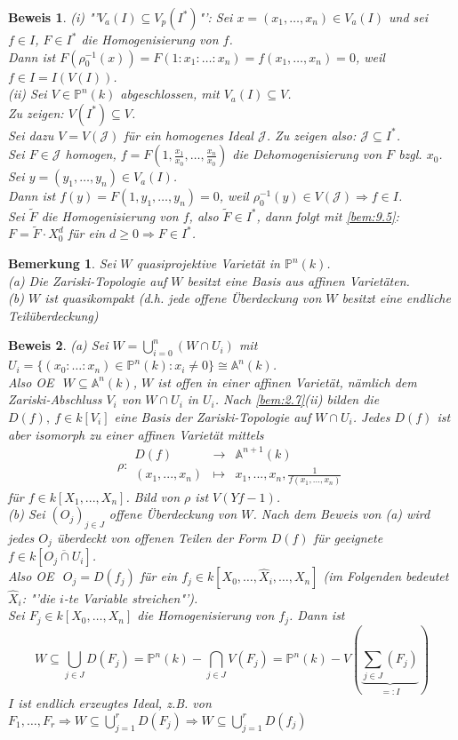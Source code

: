 \documentclass[a4paper,12pt]{report}
\theoremstyle{break}
\newtheorem{Bem}[Def]{Bemerkung}
\theoremstyle{nonumberbreak}
\theoremstyle{nonumberplain}
\newtheorem{Bew}{Beweis}
\newcommand{\Abb}[5]{\ensuremath{#1:\begin{array}{ccc} #2 & \longrightarrow & #3 \\ #4 & \longmapsto & #5 \end{array}}}
\renewcommand{\OE}{O\!\!E~}
\begin{document}
\begin{Bew}
(i) "'$V_a(I)\subseteq V_p(I^*)$"': Sei $x=(x_1,\dots,x_n)\in V_a(I)$ und sei $f\in I$, $F\in I^*$ die Homogenisierung von $f$.\\
Dann ist $F(\rho_0^{-1}(x))=F(1:x_1:\dots:x_n)=f(x_1,\dots,x_n)=0$, weil $f\in I =I(V(I))$.\\
(ii) Sei $V\in \mathbb{P}^n(k)$ abgeschlossen, mit $V_a(I)\subseteq V$.\\
Zu zeigen: $V(I^*)\subseteq V$.\\
Sei dazu $V=V(\mathcal{J})$ für ein homogenes Ideal $\mathcal{J}$. Zu zeigen also: $\mathcal{J}\subseteq I^*$.\\
Sei $F\in \mathcal{J}$ homogen, $f=F(1,\frac{x_1}{x_0},\dots,\frac{x_n}{x_0})$ die Dehomogenisierung von $F$ bzgl. $x_0$.\\
Sei $y=(y_1,\dots,y_n)\in V_a(I)$.\\
Dann ist $f(y)=F(1,y_1,\dots,y_n)=0$, weil $\rho_0^{-1}(y)\in V(\mathcal{J})\Rightarrow f\in I$.\\
Sei $\tilde{F}$ die Homogenisierung von $f$, also $\tilde{F}\in I^*$, dann folgt mit \ref{bem:9.5}: $F=\tilde{F}\cdot X_0^d$ für ein $d\geq0\Rightarrow F\in I^*$.
\end{Bew}



\begin{Bem}
\label{bem:9.9}
Sei $W$ quasiprojektive Varietät in $\mathbb{P}^n(k)$.\\
(a) Die Zariski-Topologie auf $W$ besitzt eine Basis aus affinen Varietäten.\\
(b) $W$ ist quasikompakt (d.h. jede offene Überdeckung von $W$ besitzt eine endliche Teilüberdeckung)
\end{Bem}

\begin{Bew}
(a) Sei $W=\bigcup_{i=0}^n(W\cap U_i)$ mit $U_i=\{(x_0:\dots:x_n)\in\mathbb{P}^n(k):x_i\neq 0\}\cong\mathbb{A}^n(k)$.\\
Also \OE $~W\subseteq\mathbb{A}^n(k)$, $W$ ist offen in einer affinen Varietät, nämlich dem Zariski-Abschluss $V_i$ von $W\cap U_i$ in $U_i$. Nach \ref{bem:2.7}(ii) bilden die $D(f),~f\in k[V_i]$ eine Basis der Zariski-Topologie auf $W\cap U_i$. Jedes $D(f)$ ist aber isomorph zu einer affinen Varietät mittels
$$\Abb{\rho}{D(f)}{\mathbb{A}^{n+1}(k)}{(x_1,...,x_n)}{x_1,...,x_n,\frac{1}{f(x_1,...,x_n)}}$$
für $f\in k[X_1,...,X_n]$. Bild von $\rho$ ist $V(Yf-1)$.\\
(b) Sei $(O_j)_{j\in J}$ offene Überdeckung von $W$. Nach dem Beweis von (a) wird jedes $O_j$ überdeckt von offenen Teilen der Form $D(f)$ für geeignete $f\in k[\overline{O_j\cap U_i}]$.\\
Also \OE $~O_j=D(f_j)$ für ein $f_j\in k[X_0,\dots,\hat{X}_i,\dots,X_n]$ (im Folgenden bedeutet $\hat{X}_i$: "'die $i$-te Variable streichen"').\\
Sei $F_j\in k[X_0,\dots,X_n]$ die Homogenisierung von $f_j$. Dann ist
$$W\subseteq \bigcup_{j\in J}D(F_j)=\mathbb{P}^n(k) - \bigcap_{j\in J}V(F_j)=\mathbb{P}^n(k) - V(\underbrace{\sum_{j\in J}(F_j)}_{=:I})$$
$I$ ist endlich erzeugtes Ideal, z.B. von $F_1,\dots,F_r\Rightarrow W\subseteq\bigcup_{j=1}^rD(F_j)\Rightarrow W\subseteq \bigcup_{j=1}^rD(f_j)$
\end{Bew}
\end{document}
